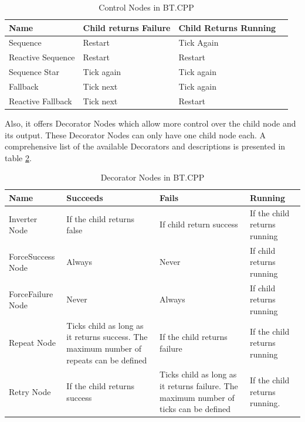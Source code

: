 \begin{table}[ht]
	\caption{Control Nodes in BT.CPP}
	\label{tab:control_nodes_bt}
	\begin{tabular}{ | m{} | m{}| m{} | m{} |} 
  	\hline
  	\textbf{Name }& \textbf{Child returns Failure} & \textbf{Child Returns Running} \\ 
  	\hline
  	Sequence & Restart & Tick Again\\ 
  	\hline
  	Reactive Sequence & Restart & Restart \\ 
  	\hline
  	Sequence Star & Tick again & Tick again \\
  	\hline
  	Fallback & Tick next & Tick again\\
  	\hline  	
  	Reactive Fallback & Tick next & Restart \\
  	\hline
	\end{tabular}
\end{table}

Also, it offers Decorator Nodes which allow more control over the child node and its output. These Decorator Nodes can only have one child node each. A comprehensive list of the available Decorators and descriptions is presented in table \ref{tab:decorators_bt}.

\begin{center}
\begin{table}[ht]
	\caption{Decorator Nodes in BT.CPP}
	\label{tab:decorators_bt}
	\begin{tabular}{ | m{} | m{}| m{} | m{} |} 
  	\hline
  	\textbf{Name} & \textbf{Succeeds} & \textbf{Fails} & \textbf{Running} \\ 
  	\hline
  	Inverter Node & If the child returns false & If child return success &  If the child returns running \\ 
  	\hline
  	ForceSuccess Node & Always & Never & If child returns running \\ 
  	\hline
  	ForceFailure Node & Never & Always & If child returns running\\
  	\hline
  	Repeat Node & Ticks child as long as it returns success. The maximum number of repeats can be defined & If the child returns failure & If the child returns running \\
  	\hline  	
  	Retry Node & If the child returns success & Ticks child as long as it returns failure. The maximum number of ticks can be defined & If the child returns running. \\
  	\hline
	\end{tabular}
\end{table}
\end{center}

